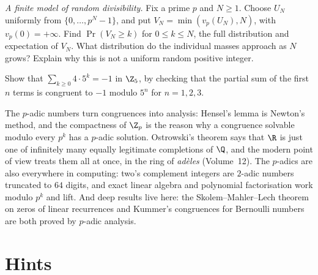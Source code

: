 \begin{exercise}[$\star\star$]\label{ex:t1-random-valuation}
\emph{A finite model of random divisibility.} Fix a prime $p$ and $N\ge1$.
Choose $U_N$ uniformly from $\{0,\dots,p^N-1\}$, and put
$V_N=\min(v_p(U_N),N)$, with $v_p(0)=+\infty$.
Find $\operatorname{Pr}(V_N\ge k)$ for $0\le k\le N$, the full distribution
and expectation of $V_N$. What distribution do the individual masses
approach as $N$ grows? Explain why this is not a uniform random positive integer.
\end{exercise}

\begin{exercise}[$\star$]\label{ex:t1-minusone}
Show that $\sum_{k\ge 0}4\cdot 5^k=-1$ in $\Z_5$, by checking that the partial sum of the first $n$ terms is congruent to $-1$ modulo $5^n$ for $n=1,2,3$.
\end{exercise}

\begin{beauty}
The $p$-adic numbers turn congruences into analysis: Hensel's lemma is Newton's method, and the compactness of $\Z_p$ is the reason why a congruence solvable modulo every $p^k$ has a $p$-adic solution. Ostrowski's theorem says that $\R$ is just one of infinitely many equally legitimate completions of $\Q$, and the modern point of view treats them all at once, in the ring of \emph{ad\`eles} (Volume~12). The $p$-adics are also everywhere in computing: two's complement integers are $2$-adic numbers truncated to $64$ digits, and exact linear algebra and polynomial factorisation work modulo $p^k$ and lift. And deep results live here: the Skolem--Mahler--Lech theorem on zeros of linear recurrences and Kummer's congruences for Bernoulli numbers are both proved by $p$-adic analysis.
\end{beauty}

\section{Hints}


